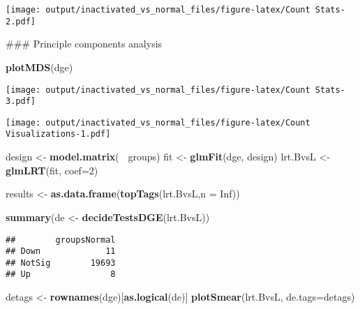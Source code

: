 \documentclass[]{article}
\newenvironment{Shaded}{\begin{snugshade}}{\end{snugshade}}
\newcommand{\KeywordTok}[1]{\textcolor[rgb]{0.13,0.29,0.53}{\textbf{#1}}}
\newcommand{\DataTypeTok}[1]{\textcolor[rgb]{0.13,0.29,0.53}{#1}}
\newcommand{\DecValTok}[1]{\textcolor[rgb]{0.00,0.00,0.81}{#1}}
\newcommand{\StringTok}[1]{\textcolor[rgb]{0.31,0.60,0.02}{#1}}
\newcommand{\OtherTok}[1]{\textcolor[rgb]{0.56,0.35,0.01}{#1}}
\newcommand{\OperatorTok}[1]{\textcolor[rgb]{0.81,0.36,0.00}{\textbf{#1}}}
\newcommand{\NormalTok}[1]{#1}
\begin{document}
\texttt{[image: output/inactivated\_vs\_normal\_files/figure-latex/Count Stats-2.pdf]}

\begin{Shaded}
\begin{Highlighting}[]
\NormalTok{### Principle components analysis}

\KeywordTok{plotMDS}\NormalTok{(dge)}
\end{Highlighting}
\end{Shaded}

\texttt{[image: output/inactivated\_vs\_normal\_files/figure-latex/Count Stats-3.pdf]}

\begin{Shaded}
\end{Shaded}

\texttt{[image: output/inactivated\_vs\_normal\_files/figure-latex/Count Visualizations-1.pdf]}

\begin{Shaded}
\begin{Highlighting}[]
\NormalTok{design <-}\StringTok{ }\KeywordTok{model.matrix}\NormalTok{(}\OperatorTok{~}\StringTok{ }\NormalTok{groups)}
\NormalTok{fit <-}\StringTok{ }\KeywordTok{glmFit}\NormalTok{(dge, design)}
\NormalTok{lrt.BvsL <-}\StringTok{ }\KeywordTok{glmLRT}\NormalTok{(fit, }\DataTypeTok{coef=}\DecValTok{2}\NormalTok{)}

\NormalTok{results <-}\StringTok{ }\KeywordTok{as.data.frame}\NormalTok{(}\KeywordTok{topTags}\NormalTok{(lrt.BvsL,}\DataTypeTok{n =} \OtherTok{Inf}\NormalTok{))}

\KeywordTok{summary}\NormalTok{(de <-}\StringTok{ }\KeywordTok{decideTestsDGE}\NormalTok{(lrt.BvsL))}
\end{Highlighting}
\end{Shaded}

\begin{verbatim}
##        groupsNormal
## Down             11
## NotSig        19693
## Up                8
\end{verbatim}

\begin{Shaded}
\begin{Highlighting}[]
\NormalTok{detags <-}\StringTok{ }\KeywordTok{rownames}\NormalTok{(dge)[}\KeywordTok{as.logical}\NormalTok{(de)]}
\KeywordTok{plotSmear}\NormalTok{(lrt.BvsL, }\DataTypeTok{de.tags=}\NormalTok{detags)}
\end{Highlighting}
\end{Shaded}
\end{document}
